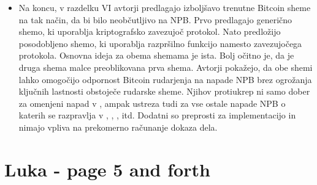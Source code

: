 \documentclass[12pt]{article}
\begin{document}
\begin{itemize}
	\item Na koncu, v razdelku VI avtorji predlagajo izboljšavo trenutne Bitcoin sheme na tak način, da bi bilo neobčutljivo na NPB. Prvo predlagajo generično shemo, ki uporablja kriptografsko zavezujoč protokol. Nato predložijo posodobljeno shemo, ki uporablja razpršilno funkcijo namesto zavezujočega protokola. Osnovna ideja za obema shemama je ista. Bolj očitno je, da je druga shema malce preoblikovana prva shema. Avtorji pokažejo, da obe shemi lahko omogočijo odpornost Bitcoin rudarjenja na napade NPB brez ogrožanja ključnih lastnosti obstoječe rudarske sheme. Njihov protiukrep ni samo dober za omenjeni napad v  \cite{originalarticle}, ampak ustreza tudi za vse ostale napade NPB o katerih se razpravlja v \cite{analysisofbitcoin}, \cite{minnersdilemma}, \cite{subversivestrategies}, itd. Dodatni so preprosti za implementacijo in nimajo vpliva na prekomerno računanje dokaza dela.
\end{itemize}

\newpage

\section{Luka - page 5 and forth}
\end{document}
